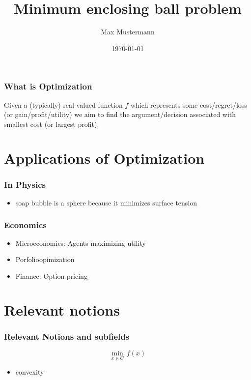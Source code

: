 \documentclass{beamer}
\title{Minimum enclosing ball problem}
\author{Max Mustermann}
\date{\today}
\begin{document}
\maketitle
\frame{\tableofcontents[currentsection]}


\begin{frame}
  \frametitle{What is Optimization}

  Given a (typically) real-valued function $f$ which represents some cost/regret/loss (or gain/profit/utility) we aim to find the argument/decision associated with smallest cost (or largest profit).

\end{frame}

\section{Applications of Optimization}

\begin{frame}
  \frametitle{In Physics}

  \begin{itemize}
    \item soap bubble is a sphere because it minimizes surface tension
  \end{itemize}

\end{frame}

\begin{frame}
  \frametitle{Economics}

  \begin{itemize}
    \item Microeconomics: Agents maximizing utility
    \item Porfolioopimization
    \item Finance: Option pricing
  \end{itemize}

\end{frame}


\section{Relevant notions}

\begin{frame}
  \frametitle{Relevant Notions and subfields}
  \begin{equation}
    \min_{x\in C} \, f(x)
  \end{equation}

  \begin{itemize}
    \item convexity
  \end{itemize}

\end{frame}
\end{document}
